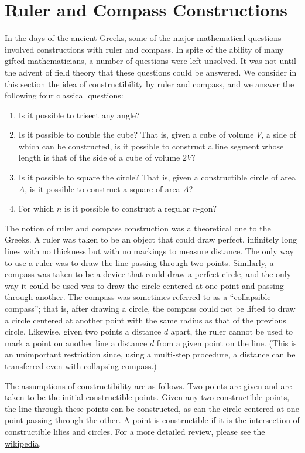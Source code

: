 \documentclass[12pt]{report}
\theoremstyle{definition}
\begin{document}
\section{Ruler and Compass Constructions}
In the days of the ancient Greeks, some of the major mathematical questions involved constructions with ruler and compass. In spite of the ability of many gifted mathematicians, a number of questions were left unsolved. It was not until the advent of field theory that these questions could be answered. We consider in this section the idea of constructibility by ruler and compass, and we answer the following four classical questions:
\begin{enumerate}
	\item Is it possible to trisect any angle?
	\item Is it possible to double the cube? That is, given a cube of volume $V$, a side of which can be constructed, is it possible to construct a line segment whose length is that of the side of a cube of volume $2V$?
	\item Is it possible to square the circle? That is, given a constructible circle of area $A$, is it possible to construct a square of area $A$?
	\item For which $n$ is it possible to construct a regular $n$-gon?
\end{enumerate}

The notion of ruler and compass construction was a theoretical one to the Greeks. A ruler was taken to be an object that could draw perfect, infinitely long lines with no thickness but with no markings to measure distance. The only way to use a ruler was to draw the line passing through two points. Similarly, a compass was taken to be a device that could draw a perfect circle, and the only way it could be used was to draw the circle centered at one point and passing through another. The compass was sometimes referred to as a ``collapsible compass''; that is, after drawing a circle, the compass could not be lifted to draw a circle centered at another point with the same radius as that of the previous circle. Likewise, given two points a distance $d$ apart, the ruler cannot be used to mark a point on another line a distance $d$ from a given point on the line. (This is an unimportant restriction since, using a multi-step procedure, a distance can be transferred even with collapsing compass.)

The assumptions of constructibility are as follows. Two points are given
and are taken to be the initial constructible points. Given any two constructible points, the line through these points can be constructed, as can the circle centered at one point passing through the other. A point is constructible if it is the intersection of constructible lilies and circles. For a more detailed review, please see the \hyperlink{https://en.wikipedia.org/wiki/Straightedge_and_compass_construction}{wikipedia}.
\end{document}
